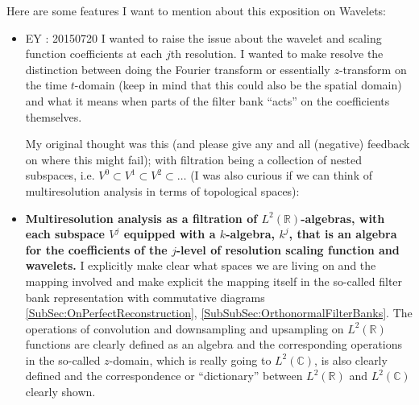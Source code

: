 \documentclass[twoside]{amsart}
\theoremstyle{plain}
\theoremstyle{definition}
\theoremstyle{remark}
\numberwithin{equation}{section}
\begin{document}
Here are some features I want to mention about this exposition on Wavelets:
\begin{itemize}
\item EY : 20150720 I wanted to raise the issue about the wavelet and scaling function coefficients at each $j$th resolution.  I wanted to make resolve the distinction between doing the Fourier transform or essentially $z$-transform on the time $t$-domain (keep in mind that this could also be the spatial domain) and what it means when parts of the filter bank ``acts'' on the coefficients themselves.   

My original thought was this (and please give any and all (negative) feedback on where this might fail); with filtration being a collection of nested subspaces, i.e. $V^0 \subset V^1 \subset V^2 \subset \dots$ (I was also curious if we can think of multiresolution analysis in terms of topological spaces):

\item \textbf{Multiresolution analysis as a filtration of $L^2(\mathbb{R})$-algebras, with each subspace $V^j$ equipped with a $k$-algebra, $k^j$, that is an algebra for the coefficients of the $j$-level of resolution scaling function and wavelets.}  I explicitly make clear what spaces we are living on and the mapping involved and make explicit the mapping itself in the so-called filter bank representation with commutative diagrams \ref{SubSec:OnPerfectReconstruction}, \ref{SubSubSec:OrthonormalFilterBanks}.  The operations of convolution and downsampling and upsampling on $L^2(\mathbb{R})$ functions are clearly defined as an algebra and the corresponding operations in the so-called $z$-domain, which is really going to $L^2(\mathbb{C})$, is also clearly defined and the correspondence or ``dictionary'' between $L^2(\mathbb{R})$ and $L^2(\mathbb{C})$ clearly shown. 


\end{itemize}
\end{document}
